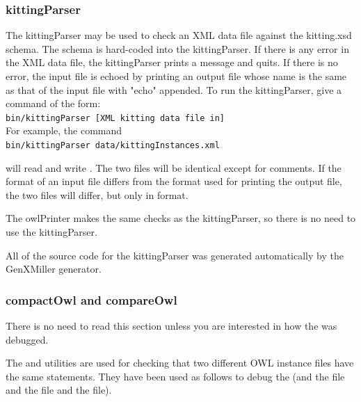 \subsubsection{kittingParser}
The kittingParser may be used to check an XML data file against the
kitting.xsd schema. The schema is hard-coded into the kittingParser.
If there is any error in the XML data file, the kittingParser prints
a message and quits. If there is no error, the input file is echoed by
printing an output file whose name is the same as that of the input file
with "echo" appended. To run the kittingParser, give a command of the
form:\\
\texttt{bin/kittingParser [XML kitting data file in]}\\

For example, the command\\

\texttt{bin/kittingParser data/kittingInstances.xml}

will read  and write . The
two files will be identical except for comments. If the format of an
input file differs from the format used for printing the output file,
the two files will differ, but only in format.

The owlPrinter makes the same checks as the kittingParser, so there is
no need to use the kittingParser.

All of the source code for the kittingParser was generated automatically
by the GenXMiller generator.

\subsubsection{compactOwl and compareOwl}
There is no need to read this section unless you are interested in how the
 was debugged.

The  and  utilities are used for checking that two
different OWL instance files have the same statements. They have been
used as follows to debug the  (and the  file
and the  file and the  file).

